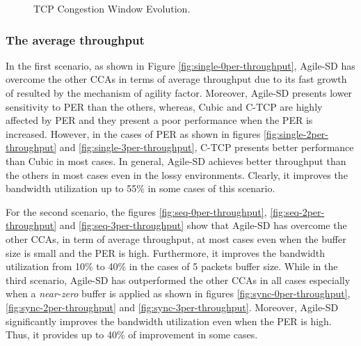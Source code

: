 \documentclass[preprint,3p,times,twocolumn,authoryear]{elsarticle}
\begin{document}
\begin{figure*} [t!]
	\centering
	\begin{center}
	\end{center}
	\caption{TCP Congestion Window Evolution.}
	\label{fig:CWND}
\end{figure*}

\subsubsection{The average throughput}
In the first scenario, as shown in Figure \ref{fig:single-0per-throughput}, Agile-SD has overcome the other CCAs in terms of average throughput due to its fast growth of  resulted by the mechanism of agility factor. Moreover, Agile-SD presents lower sensitivity to PER than the others, whereas, Cubic and C-TCP are highly affected by PER and they present a poor performance when the PER is increased. However, in the cases of  PER as shown in figures \ref{fig:single-2per-throughput} and \ref{fig:single-3per-throughput}, C-TCP presents better performance than Cubic in most cases. In general, Agile-SD achieves better throughput than the others in most cases even in the lossy environments. Clearly, it improves the bandwidth utilization up to 55\% in some cases of this scenario.

For the second scenario, the figures \ref{fig:seq-0per-throughput}, \ref{fig:seq-2per-throughput} and \ref{fig:seq-3per-throughput} show that Agile-SD has overcome the other CCAs, in term of average throughput, at most cases even when the buffer size is small and the PER is high. Furthermore, it improves the bandwidth utilization from 10\% to 40\% in the cases of 5 packets buffer size. While in the third scenario, Agile-SD has outperformed the other CCAs in all cases especially when a \emph{near-zero} buffer is applied as shown in figures \ref{fig:sync-0per-throughput}, \ref{fig:sync-2per-throughput} and \ref{fig:sync-3per-throughput}. Moreover, Agile-SD significantly improves the bandwidth utilization even when the PER is high. Thus, it provides up to 40\% of improvement in some cases.
\end{document}
